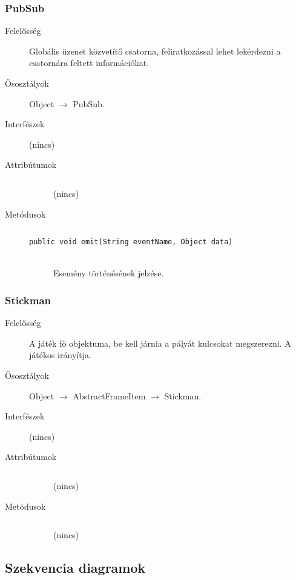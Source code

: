 		\subsubsection{PubSub}
		\begin{description}
		\item[Felelősség]
		Globális üzenet közvetítő csatorna, feliratkozással lehet lekérdezni a csatornára feltett információkat.
		\item[Ősosztályok] Object $\rightarrow{}$ PubSub.
		\item[Interfészek] (nincs)
		\item[Attribútumok]$\ $
		\begin{description}
		\item[] (nincs)
		\end{description}
		\item[Metódusok]$\ $
		\begin{description}
			\item[\texttt{public void emit(String eventName, Object data)}] \hfill \\Esemény történésének jelzése.
		\end{description}
		\end{description}
		
		\subsubsection{Stickman}
		\begin{description}
		\item[Felelősség]
		A játék fő objektuma, be kell járnia a pályát kulcsokat megszerezni. A játékos irányítja.
		\item[Ősosztályok] Object $\rightarrow{}$ AbstractFrameItem $\rightarrow{}$ Stickman.
		\item[Interfészek] (nincs)
		\item[Attribútumok]$\ $
		\begin{description}
		\item[] (nincs)
		\end{description}
		\item[Metódusok]$\ $
		\begin{description}
		\item[] (nincs)
		\end{description}
		\end{description}
	
	\subsection{Szekvencia diagramok}
	
